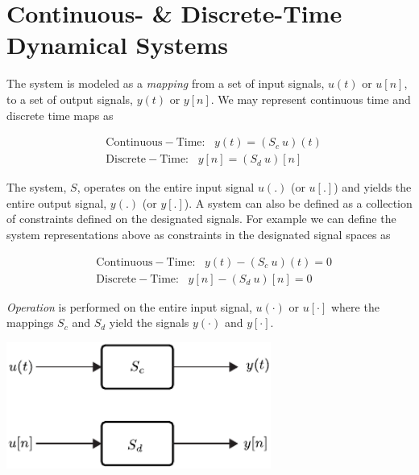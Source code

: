 \documentclass[twoside]{article}
\begin{document}
\section{Continuous- \& Discrete-Time Dynamical Systems} 

The system is modeled as a \textit{mapping} from a set of input
signals, $u(t)$ or $u[n]$, to a set of output signals, $y(t)$ or $y[n]$.
We may represent continuous time and discrete time maps as

\begin{align*}
  &\mathrm{Continuous-Time}: \ \ \ y(t) = (S_c \ u) (t) \\
  &\mathrm{Discrete-Time}: \ \ \ y[n] = (S_d \ u) [n] 
\end{align*}

The system, $S$, operates on the entire input signal $u(.)$ (or $u[.]$) and yields the
entire output signal, $y(.)$ (or $y[.]$). A system can also be defined
as a collection of constraints defined on the designated signals. For
example we can define the system representations above as constraints
in the designated signal spaces as

\begin{align*}
  &\mathrm{Continuous-Time}: \ \ \ y(t) - (S_c \ u) (t) = 0 \\
  &\mathrm{Discrete-Time}: \ \ \ y[n] - (S_d \ u) [n] = 0
\end{align*}   

\vspace{6pt}

\textit{Operation} is performed on the entire input signal, $u(\cdot)$ or
$u[\cdot]$ where the mappings $S_c$ and $S_d$ yield the signals
$y(\cdot)$ and $y[\cdot]$. 

\vspace{12pt}

    \begin{center}
  \begin{minipage}[h]{0.9\linewidth}
    \begin{center}
      \includegraphics[width=0.65\textwidth]{blocks}
    \end{center}
  \end{minipage}
    \end{center}
\end{document}
